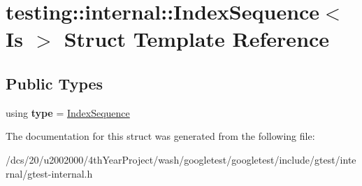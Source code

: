 \hypertarget{structtesting_1_1internal_1_1IndexSequence}{}\section{testing\+:\+:internal\+:\+:Index\+Sequence$<$ Is $>$ Struct Template Reference}
\label{structtesting_1_1internal_1_1IndexSequence}
\subsection*{Public Types}
\begin{DoxyCompactItemize}
\item 
\mbox{\label{structtesting_1_1internal_1_1IndexSequence_a89bb13a7b5d169b69659f395dcec2b2d}} 
using {\bfseries type} = \mbox{\hyperlink{structtesting_1_1internal_1_1IndexSequence}{Index\+Sequence}}
\end{DoxyCompactItemize}


The documentation for this struct was generated from the following file\+:\begin{DoxyCompactItemize}
\item 
/dcs/20/u2002000/4th\+Year\+Project/wash/googletest/googletest/include/gtest/internal/gtest-\/internal.\+h\end{DoxyCompactItemize}

